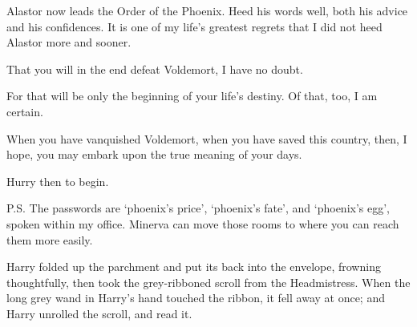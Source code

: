 \begin{writtenNote}
Alastor now leads the Order of the Phoenix. Heed his words well, both his advice and his confidences. It is one of my life's greatest regrets that I did not heed Alastor more and sooner.

That you will in the end defeat Voldemort, I have no doubt.

For that will be only the beginning of your life's destiny. Of that, too, I am certain.

When you have vanquished Voldemort, when you have saved this country, then, I hope, you may embark upon the true meaning of your days.

Hurry then to begin.


\baselineskip
P.S. The passwords are `phoenix's price', `phoenix's fate', and `phoenix's egg', spoken within my office. Minerva can move those rooms to where you can reach them more easily.
\end{writtenNote}

\later

Harry folded up the parchment and put its back into the envelope, frowning thoughtfully, then took the grey-ribboned scroll from the Headmistress. When the long grey wand in Harry's hand touched the ribbon, it fell away at once; and Harry unrolled the scroll, and read it.

\later

